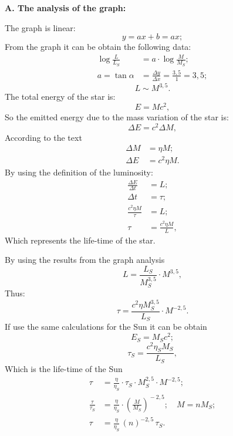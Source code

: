 \textbf{A. The analysis of the graph:}

The graph is linear:
\[
  y = ax + b = ax;
\]
From the graph it can be obtain the following data:
\begin{align*}
  \log\frac{L}{L_S} &= a\cdot\log\frac{M}{M_S}; \\
  a = \tan\alpha &= \frac{\Delta y}{\Delta x} = \frac{3{,}5}{1} = 3{,}5;
\end{align*}
\[
  L \sim M^{3,5}. \tag{1}
\]
The total energy of the star is:
\[
  E = Mc^2,
\]
So the emitted energy due to the mass variation of the star is:
\[
  \Delta E = c^2 \Delta M,
\]
According to the text
\begin{align*}
  \Delta M &= \eta M; \\
  \Delta E &= c^2 \eta M.
\end{align*}
By using the definition of the luminosity:
\begin{align*}
  \frac{\Delta E}{\Delta t} &= L; \tag{2} \\
  \Delta t &= \tau; \\
  \frac{c^2\eta M}{\tau} &= L; \\
  \tau &= \frac{c^2\eta M}{L}, \tag{2}
\end{align*}
Which represents the life-time of the star.

By using the results from the graph analysis
\[
  L = \frac{L_S}{M_S^{3,5}}\cdot M^{3,5},
\]
Thus:
\[
  \tau = \frac{c^2\eta M_S^{3,5}}{L_S}\cdot M^{-2,5}.
\]
If use the same calculations for the Sun it can be obtain
\[
  E_S = M_S c^2;
\]
\[
  \tau_S = \frac{c^2\eta_S M_S}{L_S},
\]
Which is the life-time of the Sun
\begin{align*}
  \tau &= \frac{\eta}{\eta_S}\cdot\tau_S\cdot M_S^{2,5}\cdot M^{-2,5}; \\
  \frac{\tau}{\tau_S} &= \frac{\eta}{\eta_S}\cdot\left(\frac{M}{M_S}\right)^{\!-2,5};
  \quad M = nM_S; \\
  \tau &= \frac{\eta}{\eta_S}\,(n)^{-2,5}\,\tau_S.
\end{align*}
